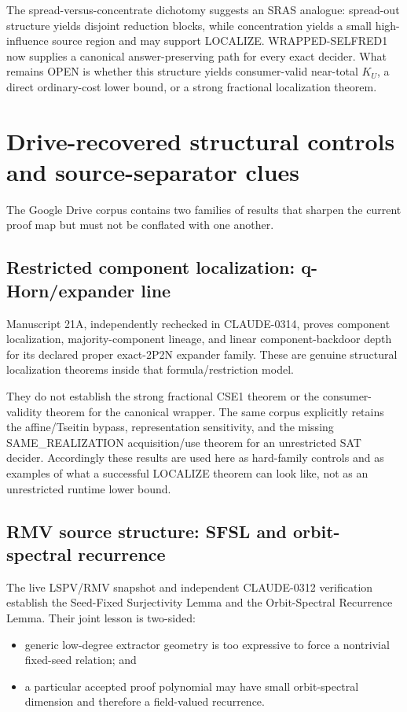 \documentclass[11pt]{article}
\theoremstyle{plain}
\theoremstyle{definition}
\theoremstyle{remark}
\begin{document}
The spread-versus-concentrate dichotomy suggests an SRAS analogue: spread-out
structure yields disjoint reduction blocks, while concentration yields a small
high-influence source region and may support LOCALIZE. WRAPPED-SELFRED1 now supplies a canonical answer-preserving path for every
exact decider.  What remains OPEN is whether this structure yields
consumer-valid near-total \(K_U\), a direct ordinary-cost lower bound, or a
strong fractional localization theorem.


\section{Drive-recovered structural controls and source-separator clues}

The Google Drive corpus contains two families of results that sharpen the
current proof map but must not be conflated with one another.

\subsection{Restricted component localization: q-Horn/expander line}

Manuscript 21A, independently rechecked in CLAUDE-0314, proves component
localization, majority-component lineage, and linear component-backdoor depth
for its declared proper exact-2P2N expander family.  These are genuine
structural localization theorems inside that formula/restriction model.

They do not establish the strong fractional CSE1 theorem or the
consumer-validity theorem for the canonical wrapper.  The same corpus explicitly
retains the affine/Tseitin bypass, representation sensitivity, and the missing
SAME\_REALIZATION acquisition/use theorem for an unrestricted SAT decider.
Accordingly these results are used here as hard-family controls and as examples
of what a successful LOCALIZE theorem can look like, not as an unrestricted
runtime lower bound.

\subsection{RMV source structure: SFSL and orbit-spectral recurrence}

The live LSPV/RMV snapshot and independent CLAUDE-0312 verification establish
the Seed-Fixed Surjectivity Lemma and the Orbit-Spectral Recurrence Lemma.
Their joint lesson is two-sided:

\begin{itemize}[leftmargin=1.4em]
\item generic low-degree extractor geometry is too expressive to force a
nontrivial fixed-seed relation; and
\item a particular accepted proof polynomial may have small orbit-spectral
dimension and therefore a field-valued recurrence.
\end{itemize}
\end{document}
